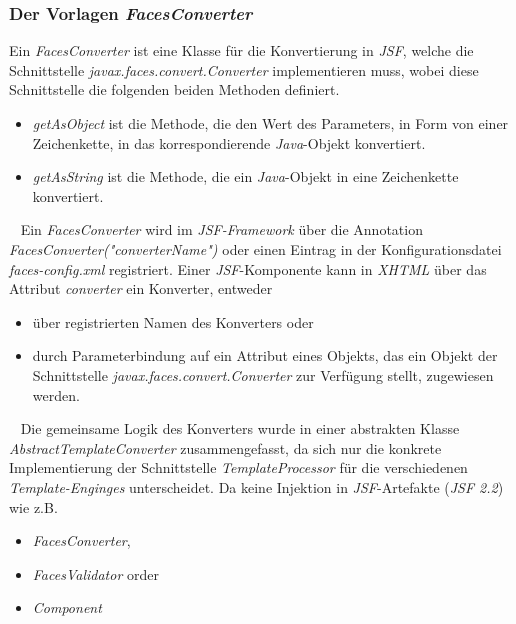 \subsubsection{Der Vorlagen \emph{FacesConverter}}
Ein \emph{FacesConverter} ist eine Klasse für die Konvertierung in \emph{JSF}, welche die Schnittstelle \emph{javax.faces.convert.Converter} implementieren muss, wobei diese Schnittstelle die folgenden beiden Methoden definiert.
\begin{itemize}
	\item\emph{getAsObject}
	\newline
	ist die Methode, die den Wert des Parameters, in Form von einer Zeichenkette, in das korrespondierende \emph{Java}-Objekt konvertiert.
	\item\emph{getAsString}
	\newline
	ist die Methode, die ein \emph{Java}-Objekt in eine Zeichenkette konvertiert.
\end{itemize}
\ \newline
Ein \emph{FacesConverter} wird im \emph{JSF-Framework} über die Annotation \emph{FacesConverter("converterName")} oder einen Eintrag in der  Konfigurationsdatei \emph{faces-config.xml} registriert. Einer \emph{JSF}-Komponente kann in \emph{XHTML} über das Attribut \emph{converter} ein Konverter, entweder 
\begin{itemize}
	\item über registrierten Namen des Konverters oder 
	\item durch Parameterbindung auf ein Attribut eines Objekts, das ein Objekt der Schnittstelle \emph{javax.faces.convert.Converter} zur Verfügung stellt, zugewiesen werden.
\end{itemize}
\ \newline
Die gemeinsame Logik des Konverters wurde in einer abstrakten Klasse \emph{AbstractTemplateConverter} zusammengefasst, da sich nur die konkrete Implementierung der Schnittstelle \emph{TemplateProcessor} für die verschiedenen \emph{Template-Enginges} unterscheidet. Da keine Injektion in \emph{JSF}-Artefakte (\emph{JSF 2.2}) wie z.B.
\begin{itemize}
	\item\emph{FacesConverter},
	\item\emph{FacesValidator} order
	\item\emph{Component}
\end{itemize}
